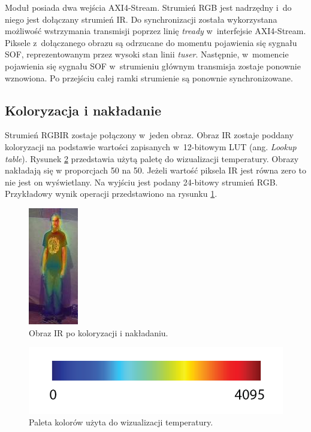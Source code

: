 Moduł posiada dwa wejścia AXI4-Stream. 
Strumień RGB jest nadrzędny i~do niego jest dołączany strumień IR. Do synchronizacji została wykorzystana możliwość wstrzymania transmisji poprzez linię \textit{tready} w~interfejsie AXI4-Stream.
Piksele z~dołączanego obrazu są odrzucane do momentu pojawienia się sygnału SOF, reprezentowanym przez wysoki stan linii \textit{tuser}.
Następnie, w~momencie pojawienia się sygnału SOF w~strumieniu głównym transmisja zostaje ponownie wznowiona. 
Po przejściu całej ramki strumienie są ponownie synchronizowane.

\subsection{Koloryzacja i nakładanie}

Strumień RGBIR zostaje połączony w~jeden obraz.
Obraz IR zostaje poddany koloryzacji na podstawie wartości zapisanych w~12-bitowym LUT (ang. \textit{Lookup table}). 
Rysunek \ref{fig:jetPalet} przedstawia użytą paletę do wizualizacji temperatury. 
Obrazy nakładają się w proporcjach 50 na 50. 
Jeżeli wartość piksela IR jest równa zero to nie jest on wyświetlany.
Na wyjściu jest podany 24-bitowy strumień RGB. 
Przykładowy wynik operacji przedstawiono na rysunku \ref{fig:koloryzacja}.
\begin{figure}
\centering
\includegraphics[width=0.3\linewidth]{images/koloryzacja.jpg}
\caption[Obraz IR po koloryzacji i nakłądaniu.]{Obraz IR po koloryzacji i nakładaniu.}
\label{fig:koloryzacja}
\end{figure}

\begin{figure}
\centering
\includegraphics[width=0.5\linewidth]{images/jetPalet.png}
\caption[Paleta kolorów użyta do wizualizacji temperatury.]{Paleta kolorów użyta do wizualizacji temperatury.}
\label{fig:jetPalet}
\end{figure}

